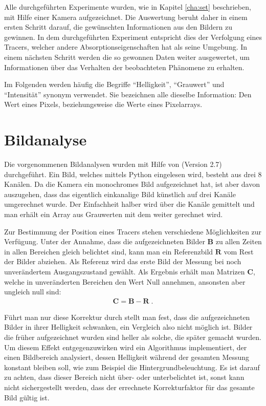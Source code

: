 \label{cha:meth}

Alle durchgeführten Experimente wurden, wie in Kapitel \ref{cha:set} beschrieben, mit Hilfe einer Kamera aufgezeichnet. Die Auswertung beruht daher in einem ersten Schritt darauf, die gewünschten Informationen aus den Bildern zu gewinnen. In dem durchgeführten Experiment entspricht dies der Verfolgung eines Tracers, welcher andere Absorptionseigenschaften hat als seine Umgebung.
In einem nächsten Schritt werden die so gewonnen Daten weiter ausgewertet, um Informationen über das Verhalten der beobachteten Phänomene zu 
erhalten.

Im Folgenden werden häufig die Begriffe "`Helligkeit"', "`Grauwert"' und "`Intensität"' synonym verwendet. Sie bezeichnen alle dieselbe Information: Den Wert eines Pixels, beziehungsweise die Werte eines Pixelarrays.

\section{Bildanalyse}
\label{sec:ima}
Die vorgenommenen Bildanalysen wurden mit Hilfe von \cite{python} (Version 2.7) durchgeführt. 
Ein Bild, welches mittels Python eingelesen wird, besteht aus drei \SI{8}{\bit} Kanälen. Da die Kamera ein monochromes Bild aufgezeichnet hat, ist aber davon auszugehen, dass das eigentlich einkanalige Bild künstlich auf drei Kanäle umgerechnet wurde. Der Einfachheit halber wird über die Kanäle gemittelt und man erhält ein Array aus Grauwerten mit dem weiter gerechnet wird.

Zur Bestimmung der Position eines Tracers stehen verschiedene Möglichkeiten zur Verfügung.
Unter der Annahme, dass die aufgezeichneten Bilder $\mathbf{B}$ zu allen Zeiten in allen Bereichen gleich belichtet sind, kann man ein Referenzbild $\mathbf{R}$ vom Rest der Bilder abziehen. Als Referenz wird das erste Bild der Messung bei noch unverändertem Ausgangszustand gewählt. Als Ergebnis erhält man Matrizen $\mathbf{C}$, welche in unveränderten Bereichen den Wert Null annehmen, ansonsten aber ungleich null sind:
\begin{eqnarray}
 \mathbf{C} = \mathbf{B} - \mathbf{R} \; .
\end{eqnarray}


Führt man nur diese Korrektur durch stellt man fest, dass die aufgezeichneten Bilder in ihrer Helligkeit schwanken, ein Vergleich also nicht möglich ist. Bilder die früher aufgezeichnet wurden sind heller als solche, die später gemacht wurden. Um diesem Effekt entgegenzuwirken wird ein Algorithmus implementiert, der einen Bildbereich analysiert, dessen Helligkeit während der gesamten Messung konstant bleiben soll, wie zum Beispiel die Hintergrundbeleuchtung. Es ist darauf zu achten, dass dieser Bereich nicht über- oder unterbelichtet ist, sonst kann nicht sichergestellt werden, dass der errechnete Korrekturfaktor für das gesamte Bild gültig ist. 


